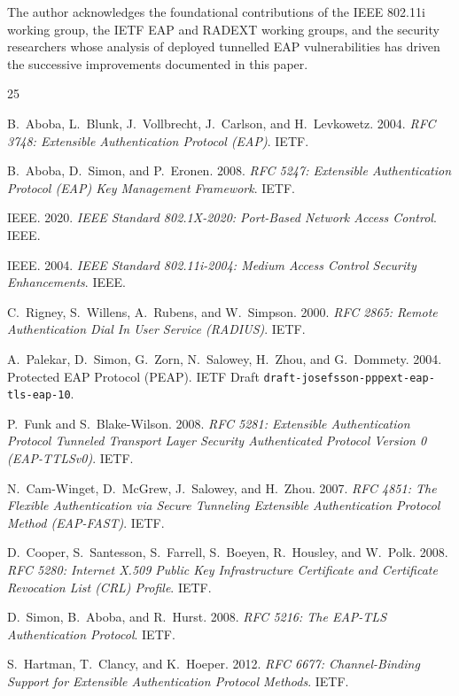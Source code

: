 \documentclass[journal]{IEEEtran}
\begin{document}
The author acknowledges the foundational contributions of the IEEE 802.11i working
group, the IETF EAP and RADEXT working groups, and the security researchers whose
analysis of deployed tunnelled EAP vulnerabilities has driven the successive
improvements documented in this paper.

\sloppy

\begin{thebibliography}{25}

B.~Aboba, L.~Blunk, J.~Vollbrecht, J.~Carlson, and H.~Levkowetz.
2004. \textit{RFC 3748: Extensible Authentication Protocol (EAP)}.
IETF.

B.~Aboba, D.~Simon, and P.~Eronen.
2008. \textit{RFC 5247: Extensible Authentication Protocol (EAP) Key Management Framework}.
IETF.

IEEE.
2020. \textit{IEEE Standard 802.1X-2020: Port-Based Network Access Control}.
IEEE.

IEEE.
2004. \textit{IEEE Standard 802.11i-2004: Medium Access Control Security Enhancements}.
IEEE.

C.~Rigney, S.~Willens, A.~Rubens, and W.~Simpson.
2000. \textit{RFC 2865: Remote Authentication Dial In User Service (RADIUS)}.
IETF.

A.~Palekar, D.~Simon, G.~Zorn, N.~Salowey, H.~Zhou, and G.~Dommety.
2004. Protected EAP Protocol (PEAP). IETF Draft
\texttt{draft-josefsson-pppext-eap-tls-eap-10}.

P.~Funk and S.~Blake-Wilson.
2008. \textit{RFC 5281: Extensible Authentication Protocol Tunneled Transport Layer Security Authenticated Protocol Version 0 (EAP-TTLSv0)}.
IETF.

N.~Cam-Winget, D.~McGrew, J.~Salowey, and H.~Zhou.
2007. \textit{RFC 4851: The Flexible Authentication via Secure Tunneling Extensible Authentication Protocol Method (EAP-FAST)}.
IETF.

D.~Cooper, S.~Santesson, S.~Farrell, S.~Boeyen, R.~Housley, and W.~Polk.
2008. \textit{RFC 5280: Internet X.509 Public Key Infrastructure Certificate and Certificate Revocation List (CRL) Profile}.
IETF.

D.~Simon, B.~Aboba, and R.~Hurst.
2008. \textit{RFC 5216: The EAP-TLS Authentication Protocol}.
IETF.

S.~Hartman, T.~Clancy, and K.~Hoeper.
2012. \textit{RFC 6677: Channel-Binding Support for Extensible Authentication Protocol Methods}.
IETF.


\end{thebibliography}
\end{document}
